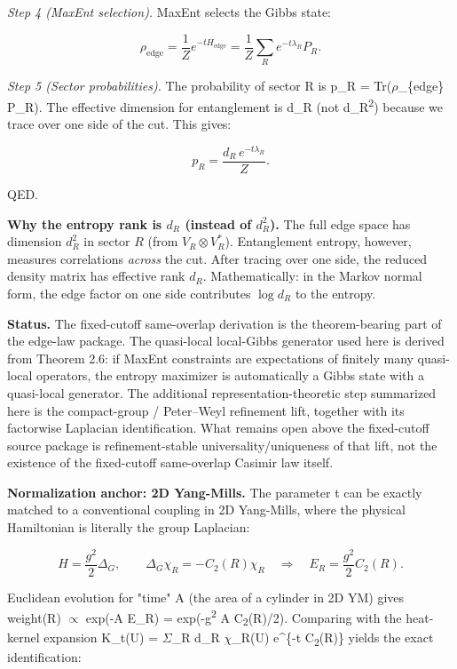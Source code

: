 \emph{Step 4 (MaxEnt selection).} MaxEnt selects the Gibbs state:

\[
\rho_{\mathrm{edge}} = \frac{1}{Z} e^{-t H_{\mathrm{edge}}} = \frac{1}{Z}
\sum_R e^{-t \lambda_R} P_R.
\]

\emph{Step 5 (Sector probabilities).} The probability of sector R is p\_R = Tr(\ensuremath{\rho}\_\{edge\} P\_R). The effective dimension for entanglement is d\_R (not d\_R\textsuperscript{2}) because we trace over one side of the cut. This gives:

\[
p_R = \frac{d_R \, e^{-t \lambda_R}}{Z}.
\]

QED.

\textbf{Why the entropy rank is \(d_R\) (instead of \(d_R^2\)).} The full edge space has dimension \(d_R^2\) in sector \(R\) (from \(V_R \otimes V_R^\ast\)). Entanglement entropy, however, measures correlations \emph{across} the cut. After tracing over one side, the reduced density matrix has effective rank \(d_R\). Mathematically: in the Markov normal form, the edge factor on one side contributes \(\log d_R\) to the entropy.

\textbf{Status.} The fixed-cutoff same-overlap derivation is the theorem-bearing part of the
edge-law package. The quasi-local local-Gibbs generator used here is derived from Theorem 2.6:
if MaxEnt constraints are expectations of finitely many quasi-local operators, the entropy
maximizer is automatically a Gibbs state with a quasi-local generator. The additional
representation-theoretic step summarized here is the compact-group / Peter--Weyl refinement
lift, together with its factorwise Laplacian identification. What remains open above the
fixed-cutoff source package is refinement-stable universality/uniqueness of that lift, not the
existence of the fixed-cutoff same-overlap Casimir law itself.

\textbf{Normalization anchor: 2D Yang-Mills.} The parameter t can be exactly matched to a conventional coupling in 2D Yang-Mills, where the physical Hamiltonian is literally the group Laplacian:

\[
H = \frac{g^2}{2} \Delta_G, \qquad
\Delta_G \chi_R = -C_2(R) \chi_R
\quad \Rightarrow \quad
E_R = \frac{g^2}{2} C_2(R).
\]

Euclidean evolution for "time" A (the area of a cylinder in 2D YM) gives weight(R) \ensuremath{\propto} exp(-A E\_R) = exp(-g\textsuperscript{2} A C\textsubscript{2}(R)/2). Comparing with the heat-kernel expansion K\_t(U) = \ensuremath{\Sigma}\_R d\_R \ensuremath{\chi}\_R(U) e\^{}\{-t C\textsubscript{2}(R)\} yields the exact identification:

